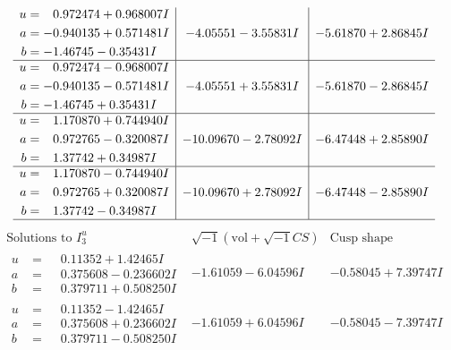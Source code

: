 \documentclass[1p]{elsarticle_modified}
\theoremstyle{definition}
\newcommand{\I}{\sqrt{-1}}
\begin{document}
$$\begin{array}{c|c|c}
\begin{aligned}
u &= \phantom{-}0.972474 + 0.968007 I \\
a &= -0.940135 + 0.571481 I \\
b &= -1.46745 - 0.35431 I\end{aligned}
 & -4.05551 - 3.55831 I & -5.61870 + 2.86845 I \\ \hline\begin{aligned}
u &= \phantom{-}0.972474 - 0.968007 I \\
a &= -0.940135 - 0.571481 I \\
b &= -1.46745 + 0.35431 I\end{aligned}
 & -4.05551 + 3.55831 I & -5.61870 - 2.86845 I \\ \hline\begin{aligned}
u &= \phantom{-}1.170870 + 0.744940 I \\
a &= \phantom{-}0.972765 - 0.320087 I \\
b &= \phantom{-}1.37742 + 0.34987 I\end{aligned}
 & -10.09670 - 2.78092 I & -6.47448 + 2.85890 I \\ \hline\begin{aligned}
u &= \phantom{-}1.170870 - 0.744940 I \\
a &= \phantom{-}0.972765 + 0.320087 I \\
b &= \phantom{-}1.37742 - 0.34987 I\end{aligned}
 & -10.09670 + 2.78092 I & -6.47448 - 2.85890 I\\
 \hline 
 \end{array}$$\newpage$$\begin{array}{c|c|c}  
\text{Solutions to }I^u_{3}& \I (\text{vol} + \sqrt{-1}CS) & \text{Cusp shape}\\
 \hline 
\begin{aligned}
u &= \phantom{-}0.11352 + 1.42465 I \\
a &= \phantom{-}0.375608 - 0.236602 I \\
b &= \phantom{-}0.379711 + 0.508250 I\end{aligned}
 & -1.61059 - 6.04596 I & -0.58045 + 7.39747 I \\ \hline\begin{aligned}
u &= \phantom{-}0.11352 - 1.42465 I \\
a &= \phantom{-}0.375608 + 0.236602 I \\
b &= \phantom{-}0.379711 - 0.508250 I\end{aligned}
 & -1.61059 + 6.04596 I & -0.58045 - 7.39747 I \\ \hline\begin{aligned}

\end{aligned}
\end{array}$$
\end{document}
